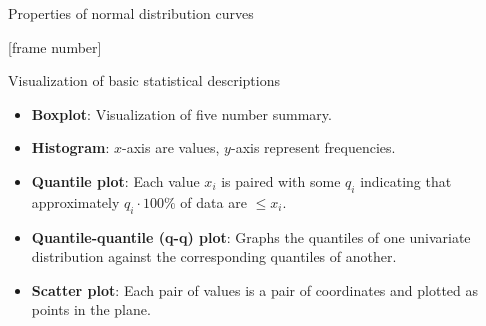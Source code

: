 \documentclass[aspectratio=169,t]{beamer}
\begin{document}
{\begin{frame}{Properties of normal distribution curves}
\begin{tikzpicture}
    \end{tikzpicture}
    \hspace{0.2cm}
    \hspace{0.2cm}
    \end{frame}
  }

{
  [frame number]
  \begin{frame}{Visualization of basic statistical descriptions}
  \begin{itemize}
    \item \textbf{Boxplot}: Visualization of five number summary.
    \item \textbf{Histogram}: $x$-axis are values, $y$-axis represent frequencies.
    \item \textbf{Quantile plot}: Each value $x_i$ is paired with some $q_i$ indicating that approximately $q_i \cdot 100 \%$ of data are $\leq x_i$.
    \item \textbf{Quantile-quantile (q-q) plot}: Graphs the quantiles of one univariate distribution against the corresponding quantiles of another.
    \item \textbf{Scatter plot}: Each pair of values is a pair of coordinates and plotted as points in the plane.
  \end{itemize}
  \end{frame}
}
\end{document}
